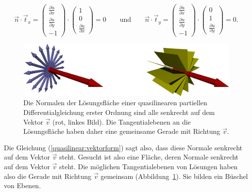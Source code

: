 \[
\vec n\cdot\vec t_x
=
\begin{pmatrix}
\frac{\partial u}{\partial x}\\
\frac{\partial u}{\partial y}\\
-1
\end{pmatrix}
\cdot
\begin{pmatrix}1\\0\\\frac{\partial u}{\partial x}\end{pmatrix}
=0
\qquad
\text{und}
\qquad
\vec n\cdot\vec t_y
=
\begin{pmatrix}
\frac{\partial u}{\partial x}\\
\frac{\partial u}{\partial y}\\
-1
\end{pmatrix}
\cdot
\begin{pmatrix}0\\1\\\frac{\partial u}{\partial y}\end{pmatrix}
=0.
\]
\begin{figure}
\begin{center}
\includegraphics[width=\hsize]{3d/normals.jpg}
\end{center}
\caption{Die Normalen der Lösungsfläche einer quasilinearen
partiellen Differentialgleichung erster Ordnung sind alle senkrecht
auf dem Vektor $\vec v$ (rot, linkes Bild). Die Tangentialebenen an
die Lösungsfläche haben daher eine gemeinsame Gerade mit Richtung $\vec v$.
\label{geometrie:normals}}
\end{figure}%
Die Gleichung (\ref{quasilinear:vektorform}) sagt also,
dass diese Normale senkrecht auf dem Vektor $\vec v$ steht.
Gesucht ist also eine Fläche, deren Normale senkrecht auf dem
Vektor $\vec v$ steht. Die möglichen Tangentialebenen von Lösungen
haben also die Gerade mit Richtung $\vec v$ gemeinsam
(Abbildung~\ref{geometrie:normals}).
Sie bilden ein Büschel von Ebenen.


